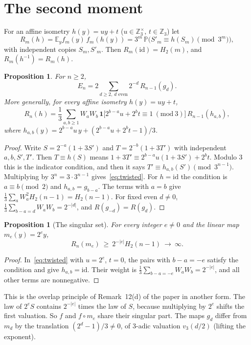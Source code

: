 \documentclass[11pt]{article}
\newtheorem{proposition}[theorem]{Proposition}
\theoremstyle{remark}
\newcommand{\Z}{\mathbb Z}
\newcommand{\E}{\mathbb E}
\newcommand{\Prob}{\mathbb P}
\begin{document}
\section{The second moment}
For an affine isometry $h(y)=uy+t$ ($u\in\Z_3^\times$, $t\in\Z_3$) let
\[
 R_m(h)=\E_y f_m(y)\,f_m(h(y))=3^m\,\Prob\bigl(S'_m\equiv h(S_m)\pmod{3^m}\bigr),
\]
with independent copies $S_m,S'_m$. Then $R_m(\mathrm{id})=H_2(m)$, and $R_m(h^{-1})=R_m(h)$.

\begin{proposition}\label{prop:energy}
For $n\ge2$,
\[
 E_n=2\sum_{d\ge2,\ d\text{ even}}2^{-d}\,R_{n-1}(g_d).
\]
More generally, for every affine isometry $h(y)=uy+t$,
\begin{equation}\label{eq:twisted}
 R_n(h)=\frac13\sum_{a,b\ge1}W_aW_b\,\mathbf 1\bigl[2^{b-a}u+2^bt\equiv1\ (\mathrm{mod}\ 3)\bigr]\,R_{n-1}(h_{a,b}),
\end{equation}
where $h_{a,b}(y)=2^{b-a}u\,y+(2^{b-a}u+2^bt-1)/3$.
\end{proposition}

\begin{proof}
Write $S=2^{-a}(1+3S')$ and $T=2^{-b}(1+3T')$ with independent $a,b,S',T'$. Then $T\equiv h(S)$ means $1+3T'\equiv2^{b-a}u(1+3S')+2^bt$. Modulo $3$ this is the indicator condition, and then it says $T'\equiv h_{a,b}(S')\pmod{3^{n-1}}$. Multiplying by $3^n=3\cdot3^{n-1}$ gives~\eqref{eq:twisted}. For $h=\mathrm{id}$ the condition is $a\equiv b\pmod2$ and $h_{a,b}=g_{b-a}$. The terms with $a=b$ give $\frac13\sum_aW_a^2H_2(n-1)=H_2(n-1)$. For fixed even $d\ne0$, $\frac13\sum_{b-a=d}W_aW_b=2^{-|d|}$, and $R(g_{-d})=R(g_d)$.
\end{proof}

\begin{proposition}[The singular set]\label{prop:singular}
For every integer $e\ne0$ and the linear map $m_e(y)=2^ey$,
\[
 R_n(m_e)\ \ge\ 2^{-|e|}H_2(n-1)\ \longrightarrow\ \infty .
\]
\end{proposition}

\begin{proof}
In~\eqref{eq:twisted} with $u=2^e$, $t=0$, the pairs with $b-a=-e$ satisfy the condition and give $h_{a,b}=\mathrm{id}$. Their weight is $\frac13\sum_{b-a=-e}W_aW_b=2^{-|e|}$, and all other terms are nonnegative.
\end{proof}

This is the overlap principle of Remark~12(d) of the paper in another form. The law of $2^eS$ contains $2^{-|e|}$ times the law of $S$, because multiplying by $2^e$ shifts the first valuation. So $f$ and $f\circ m_e$ share their singular part. The maps $g_d$ differ from $m_d$ by the translation $(2^d-1)/3\ne0$, of $3$-adic valuation $v_3(d/2)$ (lifting the exponent).
\end{document}
